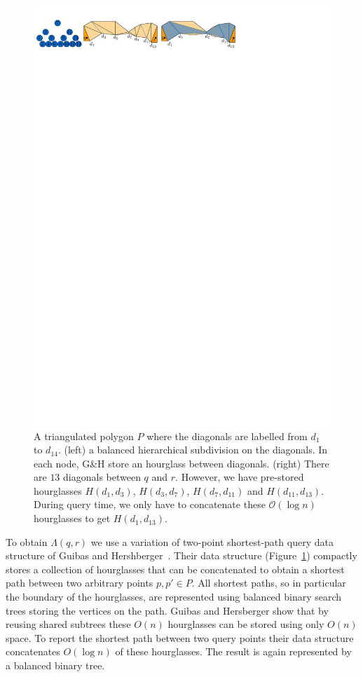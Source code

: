 \documentclass[UKenglish]{lipics-v2019}
\begin{document}
\begin{figure}[tb]
    \centering
    \includegraphics{../guibas}
    \caption{A triangulated polygon $P$ where the diagonals are labelled from $d_1$ to $d_{14}$. (left) a balanced hierarchical subdivision on the diagonals. In each node, G\&H store an hourglass between diagonals. (right) There are $13$ diagonals between $q$ and $r$. However, we have pre-stored hourglasses $H(d_1,d_3)$, $H(d_3, d_7)$, $H(d_7, d_{11})$ and $H(d_{11}, d_{13})$. During query time, we only have to concatenate these $\mathcal{O}(\log n)$ hourglasses to get $H(d_1, d_{13})$. }
    \label{fig:guibas}
\end{figure}

To obtain $\Lambda(q,r)$ we use a variation of two-point shortest-path query
data structure of Guibas and Hershberger~\cite{guibas1989optimal}. Their data
structure (Figure~\ref{fig:guibas}) compactly stores a collection of hourglasses that can be concatenated
to obtain a shortest path between two arbitrary points $p,p' \in P$. All
shortest paths, so in particular the boundary of the hourglasses, are
represented using balanced binary search trees storing the vertices on the
path. Guibas and Hersberger show that by reusing shared subtrees these $O(n)$
hourglasses can be stored using only $O(n)$ space. To report the shortest path
between two query points their data structure concatenates $O(\log n)$ of these
hourglasses. The result is again represented by a balanced binary tree.
\end{document}
